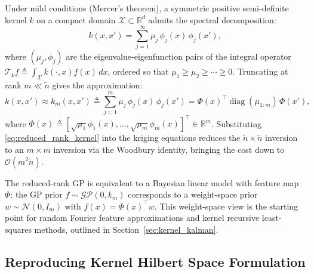 Under mild conditions (Mercer's theorem), a symmetric positive semi-definite
kernel $k$ on a compact domain $\mathcal{X} \subset \mathbb{R}^d$ admits the
spectral decomposition:
\begin{equation}
    k(x, x') = \sum_{j=1}^\infty \mu_j\,\phi_j(x)\,\phi_j(x'),
    \label{eq:Mercer}
\end{equation}
where $(\mu_j, \phi_j)$ are the eigenvalue-eigenfunction pairs of the integral
operator $\mathcal{T}_k f \triangleq \int_{\mathcal{X}} k(\cdot, x) f(x)\,dx$,
ordered so that $\mu_1 \geq \mu_2 \geq \cdots \geq 0$. Truncating at rank $m
\ll \tilde{n}$ gives the approximation:
\begin{equation}
    k(x, x') \approx k_m(x, x') \triangleq \sum_{j=1}^m \mu_j\,\phi_j(x)\,\phi_j(x')
    = \Phi(x)^\top \operatorname{diag}(\mu_{1:m})\,\Phi(x'),
    \label{eq:reduced_rank_kernel}
\end{equation}
where $\Phi(x) \triangleq [\sqrt{\mu_1}\phi_1(x), \ldots, \sqrt{\mu_m}\phi_m(x)]^\top
\in \mathbb{R}^m$. Substituting \eqref{eq:reduced_rank_kernel} into the
kriging equations reduces the $\tilde{n} \times \tilde{n}$ inversion to an
$m \times m$ inversion via the Woodbury identity, bringing the cost down to
$\mathcal{O}(m^2\tilde{n})$.

\begin{remark}
    The reduced-rank GP is equivalent to a Bayesian linear model with feature
    map $\Phi$: the GP prior $f \sim \mathcal{GP}(0, k_m)$ corresponds to a
    weight-space prior $w \sim \mathcal{N}(0, I_m)$ with $f(x) = \Phi(x)^\top
    w$. This weight-space view is the starting point for random Fourier feature
    approximations and kernel recursive least-squares methods, outlined in
    Section~\ref{sec:kernel_kalman}.
\end{remark}

\subsection{Reproducing Kernel Hilbert Space Formulation}
\label{sec:RKHS_formulation}

